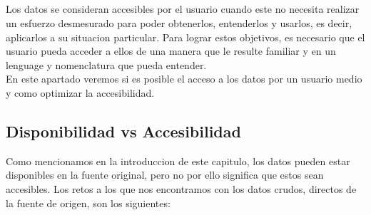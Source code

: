 \subsection*{}
Los datos se consideran accesibles por el usuario cuando este no necesita realizar un esfuerzo desmesurado para
poder obtenerlos, entenderlos y usarlos, es decir, aplicarlos a su situacion particular. Para lograr estos objetivos,
es necesario que el usuario pueda acceder a ellos de una manera que le resulte familiar y en un lenguage y nomenclatura
que pueda entender.\\ 

En este apartado veremos si es posible el acceso a los datos por un usuario medio y como optimizar la accesibilidad.
\subsection{Disponibilidad vs Accesibilidad}
    
Como mencionamos en la introduccion de este capitulo, los datos pueden estar disponibles en la fuente original, pero no por
ello significa que estos sean accesibles.
Los retos a los que nos encontramos con los datos crudos, directos de la fuente de origen, son los siguientes:
    
